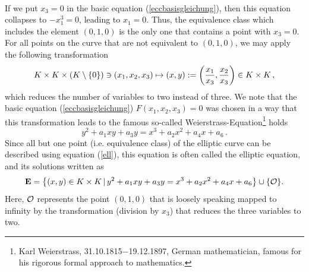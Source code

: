 \\ If we put $x_3=0$ in the basic equation (\ref{eccbasisgleichung}), then this equation collapses to $-x_1^3=0$, leading to $x_1=0$. Thus, the equivalence class which includes the element $(0,1,0)$ is the only one that contains a point with $x_3=0$. For all points on the curve that are not equivalent to $(0,1,0)$, we may apply the following transformation
$$ K\times K\times (K\setminus\{0\})\ni (x_1,x_2,x_3) \mapsto (x,y):=\left( {x_1\over x_3}, {x_2\over x_3}\right) \in K\times K \, ,
$$
which reduces the number of variables to two instead of three. We note that the
basic equation (\ref{eccbasisgleichung}) $F(x_1,x_2,x_3)=0$  was chosen in a
way that this transformation leads to the famous so-called
Weierstrass-Equation\footnote{Karl Weierstrass, 31.10.1815$-$19.12.1897, German
mathematician, famous for his rigorous formal approach to mathematics.} holds
\begin{equation}
 y^2+a_1xy+a_3y = x^3+a_2x^2+a_4x+a_6 \, .
\label{ell}
\end{equation}
Since all but one point (i.e. equivalence class) of the elliptic curve can be described using equation (\ref{ell}), this equation is often called the elliptic equation, and its solutions written as
$$ {\bf E} = \left\{(x,y)\in K\times K \, |\, y^2+a_1xy+a_3y = x^3+a_2x^2+a_4x+a_6  \right\} \cup \{{\cal O} \}.
$$
Here, ${\cal O}$ represents the point $(0,1,0)$ that is loosely speaking mapped to infinity by the transformation (division by $x_3$) that reduces the three variables to two.

